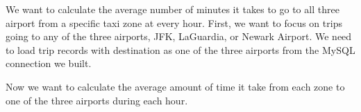 \documentclass[12pt,twoside]{reedthesis}
\newenvironment{Shaded}{\begin{snugshade}}{\end{snugshade}}
\newcommand{\KeywordTok}[1]{\textcolor[rgb]{0.13,0.29,0.53}{\textbf{#1}}}
\newcommand{\DecValTok}[1]{\textcolor[rgb]{0.00,0.00,0.81}{#1}}
\newcommand{\StringTok}[1]{\textcolor[rgb]{0.31,0.60,0.02}{#1}}
\newcommand{\CommentTok}[1]{\textcolor[rgb]{0.56,0.35,0.01}{\textit{#1}}}
\newcommand{\OperatorTok}[1]{\textcolor[rgb]{0.81,0.36,0.00}{\textbf{#1}}}
\newcommand{\NormalTok}[1]{#1}
\theoremstyle{definition}
\theoremstyle{definition}
\theoremstyle{definition}
\theoremstyle{remark}
\begin{document}
We want to calculate the average number of minutes it takes to go to all
three airport from a specific taxi zone at every hour. First, we want to
focus on trips going to any of the three airports, JFK, LaGuardia, or
Newark Airport. We need to load trip records with destination as one of
the three airports from the MySQL connection we built.
\begin{Shaded}
\end{Shaded}
Now we want to calculate the average amount of time it take from each
zone to one of the three airports during each hour.
\end{document}
